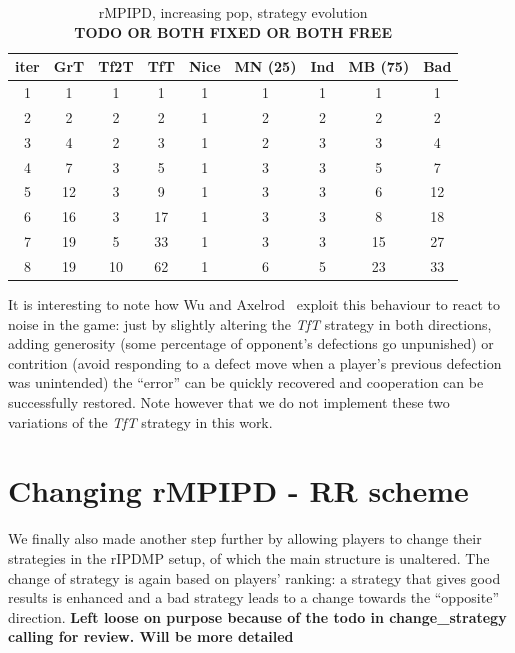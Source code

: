 \documentclass[journal,a4paper,10pt,twoside]{IEEEtran} %
\begin{document}
\begin{table}[ht]
    \caption{rMPIPD, increasing pop, strategy evolution\\ \textbf{TODO OR BOTH FIXED OR BOTH FREE}}
    \label{tab:ripdmp-const}
    \centering
    \begin{tabular}{c|cccccccc} \toprule
        iter & GrT & Tf2T & TfT & Nice & MN (25) & Ind & MB (75) & Bad \\ \midrule
        1 &   1 &   1 &   1 &  1 &  1 &  1 &   1 &   1 \\
        2 &   2 &   2 &   2 &  1 &  2 &  2 &   2 &   2 \\
        3 &   4 &   2 &   3 &  1 &  2 &  3 &   3 &   4 \\
        4 &   7 &   3 &   5 &  1 &  3 &  3 &   5 &   7 \\
        5 &  12 &   3 &   9 &  1 &  3 &  3 &   6 &  12 \\
        6 &  16 &   3 &  17 &  1 &  3 &  3 &   8 &  18 \\
        7 &  19 &   5 &  33 &  1 &  3 &  3 &  15 &  27 \\
        8 &  19 &  10 &  62 &  1 &  6 &  5 &  23 &  33 \\ \bottomrule
    \end{tabular}
\end{table}

It is interesting to note how Wu and Axelrod~\cite{IPDnoise} exploit this behaviour to react to noise in the game: just by slightly altering the \textit{TfT} strategy in both directions, adding generosity (some percentage of opponent's defections go unpunished) or contrition (avoid responding to a defect move when a player's previous defection was unintended) the ``error'' can be quickly recovered and cooperation can be successfully restored. Note however that we do not implement these two variations of the \textit{TfT} strategy in this work.

\section{Changing rMPIPD - RR scheme} \label{s:crIPDMP}
We finally also made another step further by allowing players to change their strategies in the rIPDMP setup, of which the main structure is unaltered. The change of strategy is again based on players' ranking: a strategy that gives good results is enhanced and a bad strategy leads to a change towards the ``opposite'' direction.
\textbf{Left loose on purpose because of the todo in change_strategy calling for review. Will be more detailed}
\end{document}
